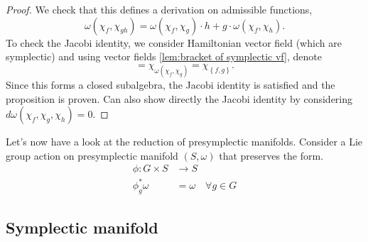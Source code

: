 \begin{proof}
    We check that this defines a derivation on admissible functions,
    \begin{equation}
        \omega(\chi_f, \chi_{gh}) = \omega(\chi_f, \chi_g)\cdot h + g \cdot \omega(\chi_f, \chi_h).
    \end{equation}
    To check the Jacobi identity, we consider Hamiltonian vector field (which are symplectic) and using vector fields \cref{lem:bracket of symplectic vf}, denote
    \begin{equation}
        [\chi_f, \chi_g] = \chi_{\omega(\chi_f, \chi_g)} = \chi_{\left\{ f,g \right\}}.
    \end{equation}
    Since this forms a closed subalgebra, the Jacobi identity is satisfied and the proposition is proven. Can also show directly the Jacobi identity by considering
    $d \omega(\chi_f, \chi_g, \chi_h) = 0$.
\end{proof}
% 
\label{def:Isotropic presymplectic submanifold}

Let's now have a look at the reduction of presymplectic manifolds.
Consider a Lie group action on presymplectic manifold $(S,\omega)$ that preserves the form.
\begin{align}
    \phi : G \times S &\rightarrow S\\
    \phi^*_g \omega &= \omega \quad \forall g \in G
\end{align}

\subsection{Symplectic manifold} %
\label{sub:symplectic_mfd}

